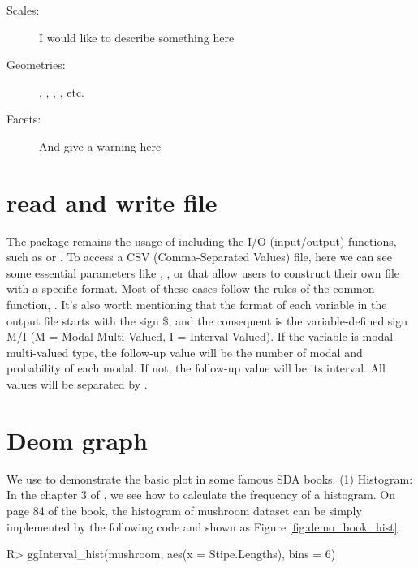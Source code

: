 \documentclass[article]{jss}
\begin{document}
\begin{description}
     \item[Scales:] I would like to describe something here
     \item[Geometries:] , ,  , , etc.
     \item[Facets:] And give a warning here
\end{description}

\section*{read and write file}

The  package remains the usage of  including the I/O (input/output) functions, such as  or . To access a CSV (Comma-Separated Values) file, here we can see some essential parameters like , , or  that allow users to construct their own file with a specific format. Most of these cases follow the rules of the common  function, . It's also worth mentioning that the format of each variable in the output file starts with the sign \$, and the consequent is the variable-defined sign M/I (M = Modal Multi-Valued, I = Interval-Valued). If the variable is modal multi-valued type, the follow-up value will be the number of modal and probability of each modal. If not, the follow-up value will be its interval. All values will be separated by .

\section*{Deom graph}

We use  to demonstrate the basic plot in some famous SDA books. (1) Histogram: In the chapter 3 of \cite{billard:2006}, we see how to calculate the frequency of a histogram. On page 84 of the book, the histogram of mushroom dataset can be simply implemented by the following code and shown as Figure \ref{fig:demo_book_hist}:
\begin{CodeChunk}
\begin{CodeInput}
R> ggInterval_hist(mushroom, aes(x = Stipe.Lengths), bins = 6)
\end{CodeInput}
\end{CodeChunk}
\end{document}
